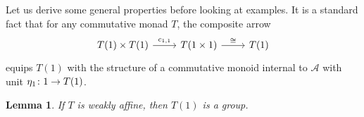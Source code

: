 \documentclass[a4paper,UKenglish,numberwithinsect,cleveref, autoref, thm-restate]{lipics-v2021}
\theoremstyle{plain} %
\newtheorem{mylemma}[mytheorem]{Lemma}
\theoremstyle{definition} %
\begin{document}
Let us derive some general properties before looking at examples.
It is a standard fact that for any commutative monad $T$, the composite arrow
\[
	\begin{tikzcd}
		T(1) \times T(1) \ar{r}{c_{1,1}}	& T(1 \times 1) \ar{r}{\cong}	& T(1)		
	\end{tikzcd}
\]
equips $T(1)$ with the structure of a commutative monoid internal to $\mathcal{A}$ with unit $\freccia{1}{\eta_1}{T(1)}$.

\begin{mylemma}
	\label{lem:T1_group}
	If $T$ is weakly affine, then $T(1)$ is a group.
\end{mylemma}

\end{document}
